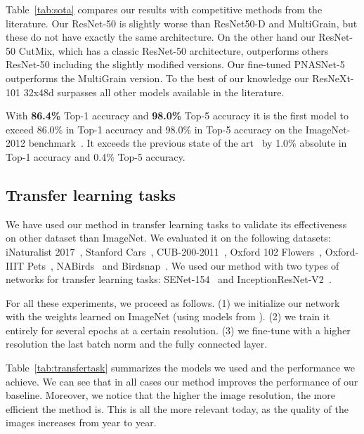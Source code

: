 \documentclass{article}
\begin{document}
Table~\ref{tab:sota} compares our results with competitive methods from the literature. 
Our ResNet-50 is slightly worse than ResNet50-D and MultiGrain, but these do not have exactly the same architecture.
On the other hand our ResNet-50 CutMix, which has a classic ResNet-50 architecture, outperforms others ResNet-50 including the slightly modified versions.
Our fine-tuned PNASNet-5 outperforms the MultiGrain version.
To the best of our knowledge our ResNeXt-101 32x48d  surpasses all other models available in the literature.

With \textbf{86.4\%} Top-1 accuracy and \textbf{98.0\%} Top-5 accuracy it is the first model to exceed 86.0\% in Top-1 accuracy and  98.0\% in Top-5 accuracy on the ImageNet-2012 benchmark~\cite{Russakovsky2015ImageNet12}.
It exceeds the previous state of the art~\cite{mahajan2018exploring} by 1.0\% absolute in Top-1 accuracy and 0.4\% Top-5 accuracy.


\subsection{Transfer learning tasks}
\label{sec:transferlearning}

We have used our method in transfer learning tasks to validate its effectiveness on other dataset than ImageNet. We evaluated it on the following datasets:
iNaturalist 2017~\cite{Horn2017INaturalist}, Stanford Cars~\cite{Cars2013}, CUB-200-2011~\cite{WahCUB_200_2011}, Oxford 102 Flowers~\cite{Nilsback08}, Oxford-IIIT Pets~\cite{parkhi12a}, NABirds~\cite{Horn2015NaBirds} and Birdsnap~\cite{Berg2014Birdsnap}.
We used our method with two types of networks for transfer learning tasks: SENet-154~\cite{Hu2017SENet} and InceptionResNet-V2~\cite{Szegedy2016InceptionResNetV2}.

For all these experiments, we proceed as follows.
(1) we initialize our network with the weights learned on ImageNet (using models from \cite{pretrainedpytorch}).
(2) we train it entirely for several epochs at a certain resolution. 
(3) we fine-tune with a higher resolution the last batch norm and the fully connected layer. 

Table~\ref{tab:transfertask} summarizes the models we used and the performance we achieve.
We can see that in all cases our method improves the performance of our baseline.
Moreover, we notice that the higher the image resolution, the more efficient the method is.
This is all the more relevant today, as the quality of the images increases from year to year. 
\end{document}
